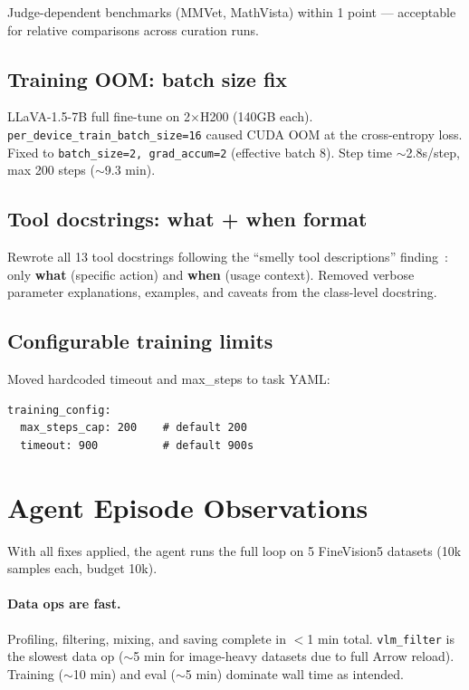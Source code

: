\noindent Judge-dependent benchmarks (MMVet, MathVista) within 1 point --- acceptable for relative comparisons across curation runs.

\subsection{Training OOM: batch size fix}

LLaVA-1.5-7B full fine-tune on 2$\times$H200 (140GB each).
\texttt{per\_device\_train\_batch\_size=16} caused CUDA OOM at the cross-entropy loss.
Fixed to \texttt{batch\_size=2, grad\_accum=2} (effective batch 8).
Step time $\sim$2.8s/step, max 200 steps ($\sim$9.3 min).

\subsection{Tool docstrings: what + when format}

Rewrote all 13 tool docstrings following the ``smelly tool descriptions'' finding~\cite{smellyToolDesc2026}: only \textbf{what} (specific action) and \textbf{when} (usage context).
Removed verbose parameter explanations, examples, and caveats from the class-level docstring.

\subsection{Configurable training limits}

Moved hardcoded timeout and max\_steps to task YAML:
\begin{verbatim}
training_config:
  max_steps_cap: 200    # default 200
  timeout: 900          # default 900s
\end{verbatim}



\section{Agent Episode Observations}

With all fixes applied, the agent runs the full loop on 5 FineVision5 datasets (10k samples each, budget 10k).

\paragraph{Data ops are fast.}
Profiling, filtering, mixing, and saving complete in $<$1 min total.
\texttt{vlm\_filter} is the slowest data op ($\sim$5 min for image-heavy datasets due to full Arrow reload).
Training ($\sim$10 min) and eval ($\sim$5 min) dominate wall time as intended.

